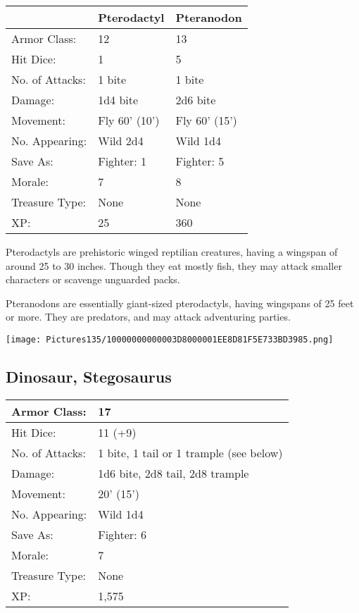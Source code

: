 \documentclass[a4paper,twoside,openany,10pt]{book}
\begin{document}
\begin{multicols}{2}
\begin{tabularx}{0.48\textwidth}{lXX}
& Pterodactyl & Pteranodon \\\hline
Armor Class: & 12 & 13 \\\hline
Hit Dice: & 1 & 5 \\\hline
No. of Attacks: & 1 bite & 1 bite \\\hline
Damage: & 1d4 bite & 2d6 bite \\\hline
Movement: & Fly 60' (10') & Fly
60' (15') \\\hline
No. Appearing: & Wild 2d4 & Wild 1d4 \\\hline
Save As: & Fighter: 1 & Fighter: 5 \\\hline
Morale: & 7 & 8 \\\hline
Treasure Type: & None & None \\\hline
XP: & 25 & 360 \\\hline
\end{tabularx}\medskip

Pterodactyls are prehistoric winged reptilian creatures, having a wingspan of around 25 to 30 inches. Though they eat mostly fish, they may attack smaller characters or scavenge unguarded packs.

Pteranodons are essentially giant-sized pterodactyls, having wingspans of 25 feet or more. They are predators, and may attack adventuring parties.

\begin{center}
	\texttt{[image: Pictures135/10000000000003D8000001EE8D81F5E733BD3985.png]}
\end{center}

\subsection*{Dinosaur, Stegosaurus}\label{dinosaur-stegosaurus}

\begin{tabularx}{0.48\textwidth}{@{}lX@{}}
Armor Class: & 17 \\\hline
Hit Dice: & 11 (+9) \\\hline
No. of Attacks: & 1 bite, 1 tail or 1 trample (see below) \\\hline
Damage: & 1d6 bite, 2d8 tail, 2d8 trample \\\hline
Movement: & 20' (15') \\\hline
No. Appearing: & Wild 1d4 \\\hline
Save As: & Fighter: 6 \\\hline
Morale: & 7 \\\hline
Treasure Type: & None \\\hline
XP: & 1,575 \\\hline
\end{tabularx}\medskip


\end{multicols}
\end{document}
